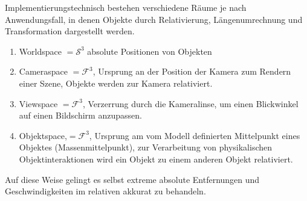Implementierungstechnisch bestehen verschiedene Räume je nach Anwendungsfall, in denen Objekte durch Relativierung, Längenumrechnung und Transformation dargestellt werden.

\begin{enumerate}
\item Worldspace $= \mathcal{S}^3$ absolute Positionen von Objekten
\item Cameraspace $= \mathcal{F}^3$, Ursprung an der Position der Kamera zum Rendern einer Szene, Objekte werden zur Kamera relativiert.
\item Viewspace $= \mathcal{F}^3$, Verzerrung durch die Kameralinse, um einen Blickwinkel auf einen Bildschirm anzupassen.
\item Objektspace,$= \mathcal{F}^3$, Ursprung am vom Modell definierten Mittelpunkt eines Objektes (Massenmittelpunkt), zur Verarbeitung von physikalischen Objektinteraktionen wird ein Objekt zu einem anderen Objekt relativiert.
\end{enumerate}

Auf diese Weise gelingt es selbst extreme absolute Entfernungen und Geschwindigkeiten im relativen akkurat zu behandeln.



